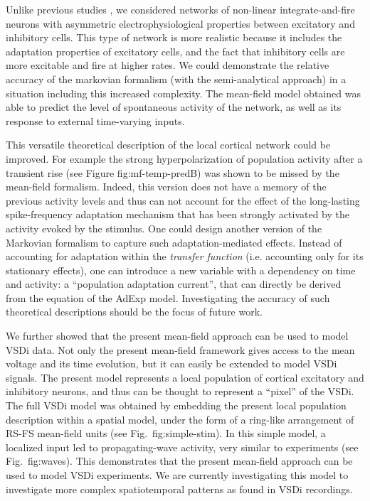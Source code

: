 \documentclass[8pt, colorlinks, a4paper]{article}
\renewcommand\ref{}
\newcommand{\corr}[1]{{#1}}
\begin{document}
Unlike previous studies
\cite{Brunel2000,Vogels2005,Kumar2008,ElBoustani2009}, we considered
networks of non-linear integrate-and-fire neurons with asymmetric
electrophysiological properties between excitatory and inhibitory
cells. This type of network is more realistic because it includes the
adaptation properties of excitatory cells, and the fact that
inhibitory cells are more excitable and fire at higher rates.  We
could demonstrate the relative accuracy of the markovian formalism
(with the semi-analytical approach) in a situation including this
increased complexity. The mean-field model obtained was able to
predict the level of spontaneous activity of the network, as well as
its response to external time-varying inputs.

This versatile theoretical description of the local cortical network
could be improved. For example the strong hyperpolarization of
population activity after a transient rise (see Figure
\ref{fig:mf-temp-pred}B) was shown to be missed by the mean-field
formalism. Indeed, this version does not have a memory of the previous
activity levels and thus can not account for the effect of the
long-lasting spike-frequency adaptation mechanism that has been
strongly activated by the activity evoked by the stimulus. One could
design another version of the Markovian formalism to capture such
adaptation-mediated effects. Instead of accounting for adaptation
within the \emph{transfer function} (i.e. accounting only for its
stationary effects), one can introduce a new variable with a
dependency on time and activity: a ``population adaptation current'',
that can directly be derived from the equation of the AdExp model.
Investigating the accuracy of such theoretical descriptions should be
the focus of future work. 

\corr{We further showed that the present mean-field approach can be
  used to model VSDi data.}  Not only the present mean-field framework
gives access to the mean voltage and its time evolution, but it can
easily be extended to model VSDi signals.  The present model
represents a local population of cortical excitatory and inhibitory
neurons, and thus can be thought to represent a ``pixel'' of the VSDi.
The full VSDi model was obtained by embedding the present local
population description within a spatial model, \corr{under the form of
  a ring-like arrangement of RS-FS mean-field units (see
  Fig.~\ref{fig:simple-stim}).  In this simple model, a localized
  input led to propagating-wave activity, very similar to experiments
  (see Fig.~\ref{fig:waves}).  This demonstrates that the present
  mean-field approach can be used to model VSDi experiments.  We are
  currently investigating this model to investigate more complex
  spatiotemporal patterns as found in VSDi recordings.}
\end{document}
